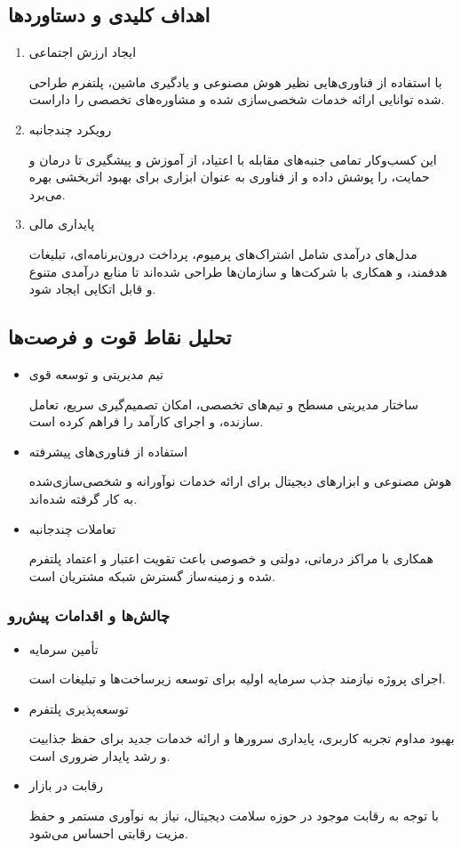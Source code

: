 \documentclass[dvipsnames, svgnames, x11names, 11pt]{article}
\begin{document}
\subsection{اهداف کلیدی و دستاوردها}
\begin{enumerate}
\item 
ایجاد ارزش اجتماعی

با استفاده از فناوری‌هایی نظیر هوش مصنوعی و یادگیری ماشین، پلتفرم طراحی شده توانایی ارائه خدمات شخصی‌سازی شده و مشاوره‌های تخصصی را داراست.

\item 
رویکرد چندجانبه

این کسب‌وکار تمامی جنبه‌های مقابله با اعتیاد، از آموزش و پیشگیری تا درمان و حمایت، را پوشش داده و از فناوری به عنوان ابزاری برای بهبود اثربخشی بهره می‌برد.

\item 
پایداری مالی

مدل‌های درآمدی شامل اشتراک‌های پرمیوم، پرداخت درون‌برنامه‌ای، تبلیغات هدفمند، و همکاری با شرکت‌ها و سازمان‌ها طراحی شده‌اند تا منابع درآمدی متنوع و قابل اتکایی ایجاد شود.
\end{enumerate}

\subsection{تحلیل نقاط قوت و فرصت‌ها}
\begin{itemize}
\item 
تیم مدیریتی و توسعه قوی

ساختار مدیریتی مسطح و تیم‌های تخصصی، امکان تصمیم‌گیری سریع، تعامل سازنده، و اجرای کارآمد را فراهم کرده است.

\item 
استفاده از فناوری‌های پیشرفته

هوش مصنوعی و ابزارهای دیجیتال برای ارائه خدمات نوآورانه و شخصی‌سازی‌شده به کار گرفته شده‌اند.

\item 
تعاملات چندجانبه

همکاری با مراکز درمانی، دولتی و خصوصی باعث تقویت اعتبار و اعتماد پلتفرم شده و زمینه‌ساز گسترش شبکه مشتریان است.
\end{itemize}

\subsubsection{چالش‌ها و اقدامات پیش‌رو}
\begin{itemize}
\item 
تأمین سرمایه

اجرای پروژه نیازمند جذب سرمایه اولیه برای توسعه زیرساخت‌ها و تبلیغات است.
\item 
توسعه‌پذیری پلتفرم

بهبود مداوم تجربه کاربری، پایداری سرورها و ارائه خدمات جدید برای حفظ جذابیت و رشد پایدار ضروری است.
\item 
رقابت در بازار

با توجه به رقابت موجود در حوزه سلامت دیجیتال، نیاز به نوآوری مستمر و حفظ مزیت رقابتی احساس می‌شود.
\end{itemize}
\end{document}
